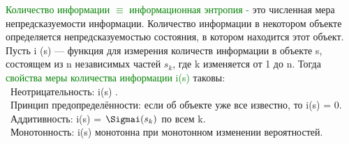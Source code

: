 \newpage

\rhead{\textbf{\textcolor{blue}{И}\textcolor{gray}{змереие количества информации}}}

\vskip 0.5cm

\textcolor{Green}{Количество информации $\equiv$ информационная энтропия - } это численная мера 
непредсказуемости информации. Количество информации в некотором объекте 
определяется непредсказуемостью состояния, в котором находится этот объект. 
\\
Пусть i (s) — функция для измерения количеств информации в объекте s, состоящем из n независимых  частей  $s_k$,  где k изменяется  от  1  до n.  Тогда \textcolor{Green}{свойства меры количества информации i(s)} таковы:\\

			\textbullet \ Неотрицательность: i(s) .\\
			\textbullet \ Принцип предопределённости: если об объекте уже все известно, то i(s) = 0. \\
			\textbullet \ Аддитивность: i(s) = $\Sigmai(s_k)$ по всем k.\\
			\textbullet \ Монотонность: i(s) монотонна при монотонном изменении вероятностей.
